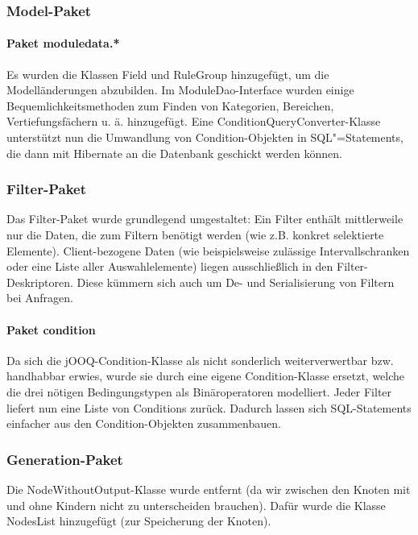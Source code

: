 \subsubsection{Model-Paket}

\paragraph{Paket moduledata.*} Es wurden die Klassen Field und RuleGroup hinzugefügt, um die Modelländerungen abzubilden. Im ModuleDao-Interface wurden einige Bequemlichkeitsmethoden zum Finden von Kategorien, Bereichen, Vertiefungsfächern u. ä. hinzugefügt. Eine ConditionQueryConverter-Klasse unterstützt nun die Umwandlung von Condition-Objekten in SQL"=Statements, die dann mit Hibernate an die Datenbank geschickt werden können.



\subsubsection{Filter-Paket}
\label{subsubsec:filter}

Das Filter-Paket wurde grundlegend umgestaltet: Ein Filter enthält mittlerweile nur die Daten, die zum Filtern benötigt werden (wie z.B. konkret selektierte Elemente). Client-bezogene Daten (wie beispielsweise zulässige Intervallschranken oder eine Liste aller Auswahlelemente) liegen ausschließlich in den Filter-Deskriptoren. Diese kümmern sich auch um De- und Serialisierung von Filtern bei Anfragen.

\paragraph{Paket condition} Da sich die jOOQ-Condition-Klasse als nicht sonderlich weiterverwertbar bzw. handhabbar erwies, wurde sie durch eine eigene Condition-Klasse ersetzt, welche die drei nötigen Bedingungstypen als Binäroperatoren modelliert. Jeder Filter liefert nun eine Liste von Conditions zurück. Dadurch lassen sich SQL-Statements einfacher aus den Condition-Objekten zusammenbauen.


\subsubsection{Generation-Paket}

Die NodeWithoutOutput-Klasse wurde entfernt (da wir zwischen den Knoten mit und ohne Kindern nicht zu unterscheiden brauchen). 
Dafür wurde die Klasse NodesList hinzugefügt (zur Speicherung der Knoten).


